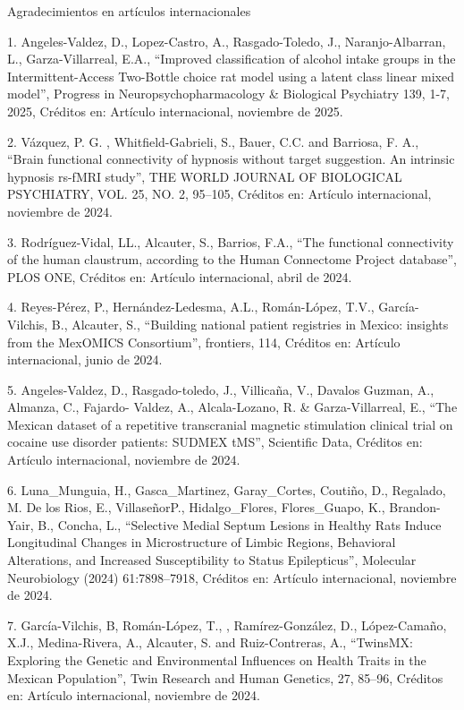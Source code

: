 Agradecimientos en artículos internacionales

1. Angeles-Valdez, D., Lopez-Castro, A., Rasgado-Toledo, J., Naranjo-Albarran, L., Garza-Villarreal, E.A., “Improved 
classification of alcohol intake groups in the Intermittent-Access Two-Bottle choice rat model using a latent class linear 
mixed model”, Progress in Neuropsychopharmacology & Biological Psychiatry 139, 1-7, 2025, Créditos en: Artículo internacional, 
noviembre de 2025.

2. Vázquez, P. G. , Whitfield-Gabrieli, S., Bauer, C.C. and Barriosa, F. A., “Brain functional connectivity of hypnosis without 
target suggestion. An intrinsic hypnosis rs-fMRI study”, THE WORLD JOURNAL OF BIOLOGICAL PSYCHIATRY, VOL. 25, NO. 2, 95–105, 
Créditos en: Artículo internacional, noviembre de 2024.

3. Rodríguez-Vidal, LL., Alcauter, S., Barrios, F.A., “The functional connectivity of the human claustrum, according to the 
Human Connectome Project database”, PLOS ONE, Créditos en: Artículo internacional, abril de 2024.

4. Reyes-Pérez, P., Hernández-Ledesma, A.L., Román-López, T.V., García-Vilchis, B., Alcauter, S., “Building national patient 
registries in Mexico: insights from the MexOMICS Consortium”, frontiers, 114, Créditos en: Artículo internacional, junio de 
2024.

5. Angeles-Valdez, D., Rasgado-toledo, J., Villicaña, V., Davalos Guzman, A., Almanza, C., Fajardo-
Valdez, A., Alcala-Lozano, R. & Garza-Villarreal, E., “The Mexican dataset of a repetitive transcranial magnetic stimulation 
clinical trial on cocaine use disorder patients: SUDMEX tMS”, Scientific Data, Créditos en: Artículo internacional, noviembre 
de 2024.

6. Luna_Munguia, H., Gasca_Martinez, Garay_Cortes, Coutiño, D., Regalado, M. De los Rios, E., VillaseñorP., Hidalgo_Flores, 
Flores_Guapo, K., Brandon-Yair, B., Concha, L., “Selective Medial Septum Lesions in Healthy Rats Induce Longitudinal Changes in 
Microstructure of Limbic Regions, Behavioral Alterations, and Increased Susceptibility to Status Epilepticus”, Molecular 
Neurobiology (2024) 61:7898–7918, Créditos en: Artículo internacional, noviembre de 2024.

7. García-Vilchis, B, Román-López, T., , Ramírez-González, D., López-Camaño, X.J., Medina-Rivera, A., Alcauter, S. and 
Ruiz-Contreras, A., “TwinsMX: Exploring the Genetic and Environmental Influences on Health Traits in the Mexican Population”, 
Twin Research and Human Genetics, 27, 85–96, Créditos en: Artículo internacional, noviembre de 2024.

